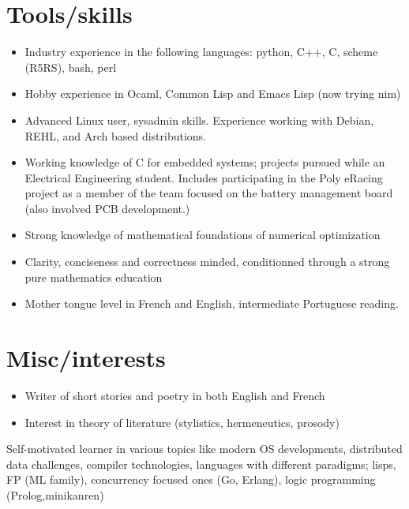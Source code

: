 \documentclass{article}
\begin{document}
\section*{Tools/skills}
\begin{itemize}
  \item Industry experience in the following languages: python, C++, C, scheme (R5RS), bash, perl
  \item Hobby experience in Ocaml, Common Lisp and Emacs Lisp (now trying nim)
  \item Advanced Linux user, sysadmin skills.  Experience working with Debian, REHL, and Arch based distributions.
  \item Working knowledge of C for embedded systems; projects pursued while an Electrical Engineering student. Includes participating in the Poly eRacing project as a member of the team focused on the battery management board (also involved PCB development.)
  \item Strong knowledge of mathematical foundations of numerical optimization
  \item Clarity, conciseness and correctness minded, conditionned through a strong pure mathematics education
  \item Mother tongue level in French and English, intermediate Portuguese reading.
\end{itemize}

\section*{Misc/interests}
\begin{itemize}
  \item Writer of short stories and poetry in both English and French
  \item Interest in theory of literature (stylistics, hermeneutics, prosody)
\end{itemize}

Self-motivated learner in various topics like modern OS developments,
distributed data challenges, compiler technologies, languages with different
paradigms; lisps, FP (ML family), concurrency focused ones (Go, Erlang), logic
programming (Prolog,minikanren)
\end{document}
